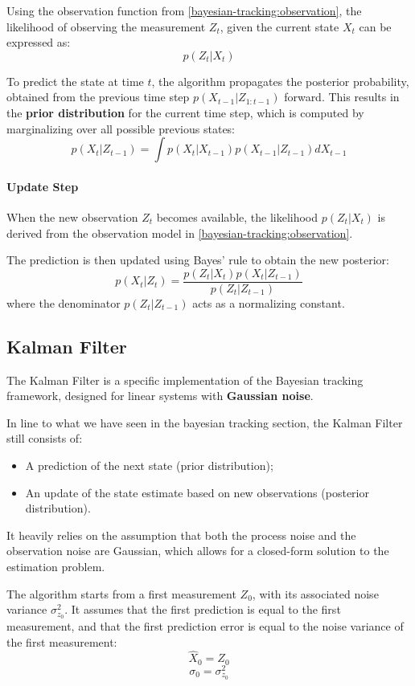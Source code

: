 Using the observation function from \ref{bayesian-tracking:observation}, the likelihood of observing the measurement $Z_t$, 
given the current state $X_t$ can be expressed as:
$$p(Z_t | X_t)$$

To predict the state at time $t$, the algorithm propagates the posterior probability, obtained from the previous time step 
$p(X_{t-1} | Z_{1:t-1})$ forward.
This results in the \textbf{prior distribution} for the current time step, which is computed by marginalizing 
over all possible previous states:
$$p(X_t | Z_{t-1}) = \int p(X_t | X_{t-1}) p(X_{t-1} | Z_{t-1}) dX_{t-1}$$

\paragraph{Update Step}
When the new observation $Z_t$ becomes available, the likelihood $p(Z_t | X_t)$ is derived from the observation model in \ref{bayesian-tracking:observation}.

The prediction is then updated using Bayes' rule to obtain the new posterior:
$$p(X_t | Z_{t}) = \frac{p(Z_t | X_t) p(X_t | Z_{t-1})} {p(Z_t | Z_{t-1})}$$
where the denominator $p(Z_t | Z_{t-1})$ acts as a normalizing constant.

\subsection{Kalman Filter}
The Kalman Filter is a specific implementation of the Bayesian tracking framework, designed for linear systems with \textbf{Gaussian noise}.

In line to what we have seen in the bayesian tracking section, the Kalman Filter still consists of:
\begin{itemize}
    \item A prediction of the next state (prior distribution);
    \item An update of the state estimate based on new observations (posterior distribution).
\end{itemize}
It heavily relies on the assumption that both the process noise and the observation noise are Gaussian, 
which allows for a closed-form solution to the estimation problem.

The algorithm starts from a first measurement $Z_0$, with its associated noise variance $\sigma_{z_0}^2$.
It assumes that the first prediction is equal to the first measurement, and that the first prediction error is equal to the noise variance of the first measurement:
$$\hat{X}_0 = Z_0$$
$$\sigma_0 = \sigma_{z_0}^2$$

